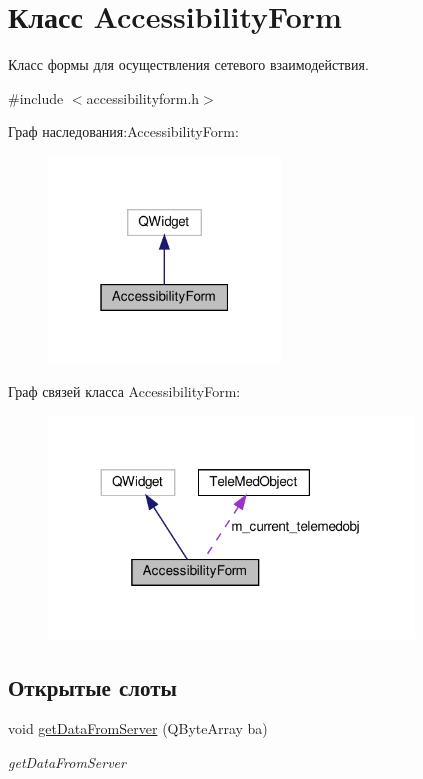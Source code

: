 \hypertarget{classAccessibilityForm}{}\section{Класс Accessibility\+Form}
\label{classAccessibilityForm}


Класс формы для осуществления сетевого взаимодействия.  




{\ttfamily \#include $<$accessibilityform.\+h$>$}



Граф наследования\+:Accessibility\+Form\+:\nopagebreak
\begin{figure}[H]
\begin{center}
\leavevmode
\includegraphics[width=175pt]{classAccessibilityForm__inherit__graph}
\end{center}
\end{figure}


Граф связей класса Accessibility\+Form\+:
\nopagebreak
\begin{figure}[H]
\begin{center}
\leavevmode
\includegraphics[width=275pt]{classAccessibilityForm__coll__graph}
\end{center}
\end{figure}
\subsection*{Открытые слоты}
\begin{DoxyCompactItemize}
\item 
void \hyperlink{classAccessibilityForm_a0c75d12469be97cc2e80a2a7e5db66d5}{get\+Data\+From\+Server} (Q\+Byte\+Array ba)
\begin{DoxyCompactList}\small\item\em get\+Data\+From\+Server \end{DoxyCompactList}\end{DoxyCompactItemize}
